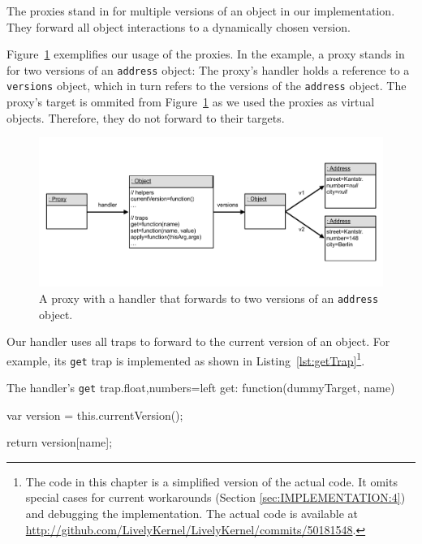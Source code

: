 The proxies stand in for multiple versions of an object in our implementation.
They forward all object interactions to a dynamically chosen version.

Figure~\ref{fig:VersioningProxy} exemplifies our usage of the proxies.
In the example, a proxy stands in for two versions of an \lstinline{address} object: The proxy's handler holds a reference to a \lstinline{versions} object, which in turn refers to the versions of the \lstinline{address} object.
The proxy's target is ommited from Figure~\ref{fig:VersioningProxy} as we used the proxies as virtual objects.
Therefore, they do not forward to their targets.

\begin{figure}[h]
    \centering
    \includegraphics[width=\textwidth]{figures/5_implementation/2_versioningProxy.pdf}
    \caption{A proxy with a handler that forwards to two versions of an \lstinline{address} object.}
    \label{fig:VersioningProxy}
\end{figure}

Our handler uses all traps to forward to the current version of an object.
For example, its \lstinline{get} trap is implemented as shown in Listing~\ref{lst:getTrap}\footnote{The code in this chapter is a simplified version of the actual code. It omits special cases for current workarounds (Section \ref{sec:IMPLEMENTATION:4}) and debugging the implementation. The actual code is available at \url{http://github.com/LivelyKernel/LivelyKernel/commits/50181548}.}.

\begin{code}{The handler's \lstinline{get} trap.}{float,numbers=left}
get: function(dummyTarget, name) {
    var version = this.currentVersion();
    
    return version[name];
}
\end{code}
\iffalse
\end{verbatim}\fi

